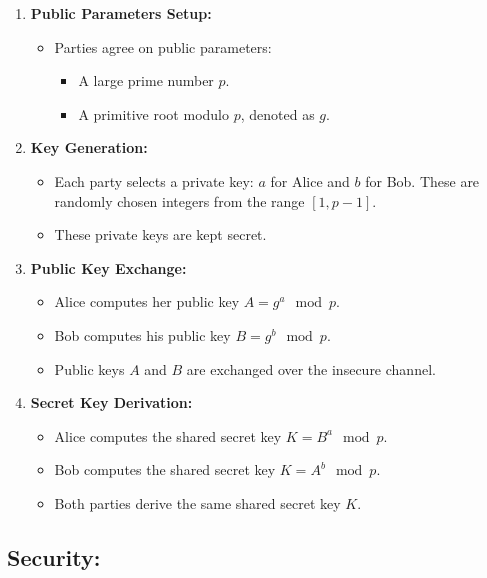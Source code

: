 \documentclass[11pt]{article}
\begin{document}
\begin{enumerate}
    \item \textbf{Public Parameters Setup:}
    \begin{itemize}
        \item Parties agree on public parameters:
        \begin{itemize}
            \item A large prime number $p$.
            \item A primitive root modulo $p$, denoted as $g$.
        \end{itemize}
    \end{itemize}
    
    \item \textbf{Key Generation:}
    \begin{itemize}
        \item Each party selects a private key: $a$ for Alice and $b$ for Bob. These are randomly chosen integers from the range $[1, p-1]$.
        \item These private keys are kept secret.
    \end{itemize}
    
    \item \textbf{Public Key Exchange:}
    \begin{itemize}
        \item Alice computes her public key $A = g^a \mod p$.
        \item Bob computes his public key $B = g^b \mod p$.
        \item Public keys $A$ and $B$ are exchanged over the insecure channel.
    \end{itemize}
    
    \item \textbf{Secret Key Derivation:}
    \begin{itemize}
        \item Alice computes the shared secret key $K = B^a \mod p$.
        \item Bob computes the shared secret key $K = A^b \mod p$.
        \item Both parties derive the same shared secret key $K$.
    \end{itemize}
\end{enumerate}

\subsection{Security:}
\end{document}
